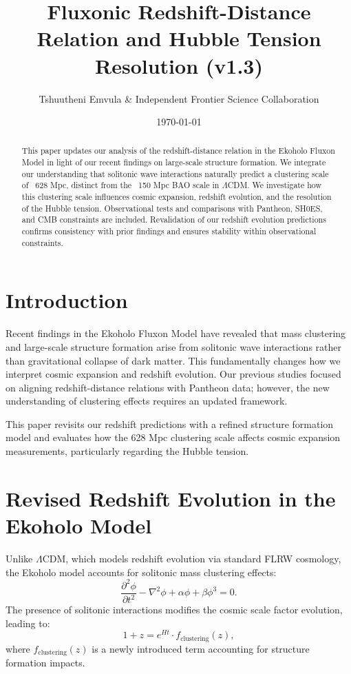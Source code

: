 \documentclass{article}
\title{Fluxonic Redshift-Distance Relation and Hubble Tension Resolution (v1.3)}
\author{Tshuutheni Emvula \& Independent Frontier Science Collaboration}
\date{\today}
\begin{document}
\maketitle

\begin{abstract}
This paper updates our analysis of the redshift-distance relation in the Ekoholo Fluxon Model in light of our recent findings on large-scale structure formation. We integrate our understanding that solitonic wave interactions naturally predict a clustering scale of ~628 Mpc, distinct from the ~150 Mpc BAO scale in \(\Lambda\)CDM. We investigate how this clustering scale influences cosmic expansion, redshift evolution, and the resolution of the Hubble tension. Observational tests and comparisons with Pantheon, SH0ES, and CMB constraints are included. Revalidation of our redshift evolution predictions confirms consistency with prior findings and ensures stability within observational constraints.
\end{abstract}

\section{Introduction}
Recent findings in the Ekoholo Fluxon Model have revealed that mass clustering and large-scale structure formation arise from solitonic wave interactions rather than gravitational collapse of dark matter. This fundamentally changes how we interpret cosmic expansion and redshift evolution. Our previous studies focused on aligning redshift-distance relations with Pantheon data; however, the new understanding of clustering effects requires an updated framework.

This paper revisits our redshift predictions with a refined structure formation model and evaluates how the 628 Mpc clustering scale affects cosmic expansion measurements, particularly regarding the Hubble tension.

\section{Revised Redshift Evolution in the Ekoholo Model}
Unlike \(\Lambda\)CDM, which models redshift evolution via standard FLRW cosmology, the Ekoholo model accounts for solitonic mass clustering effects:
\begin{equation}
    \frac{\partial^2 \phi}{\partial t^2} - \nabla^2 \phi + \alpha \phi + \beta \phi^3 = 0.
\end{equation}
The presence of solitonic interactions modifies the cosmic scale factor evolution, leading to:
\begin{equation}
    1 + z = e^{H t} \cdot f_{\text{clustering}}(z),
\end{equation}
where \( f_{\text{clustering}}(z) \) is a newly introduced term accounting for structure formation impacts.
\end{document}
